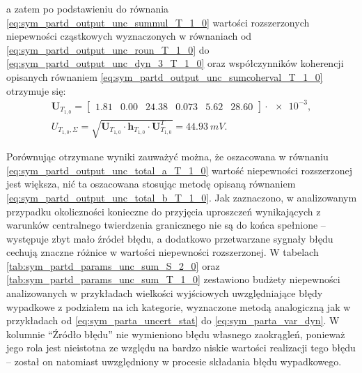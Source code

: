 a zatem po podstawieniu do równania \eqref{eq:sym_partd_output_unc_summul_T_1_0} wartości rozszerzonych niepewności cząstkowych wyznaczonych w równaniach od \eqref{eq:sym_partd_output_unc_roun_T_1_0} do \eqref{eq:sym_partd_output_unc_dyn_3_T_1_0} oraz współczynników koherencji opisanych równaniem \eqref{eq:sym_partd_output_unc_sumcoherval_T_1_0} otrzymuje się:
\begin{gather}
\mathbf{U}_{T_{1,0}} =
\begin{bmatrix}
\num{1.81} & \num{0.00} & \num{24.38} & \num{0.073} & \num{5.62} & \num{28.60}
\end{bmatrix} \cdot \num{e-3}
\label{eq:sym_partd_output_unc_sumuvectval_T_1_0}, \\
U_{T_{1,0},\Sigma} = \sqrt{\mathbf{U}_{T_{1,0}} \cdot \mathbf{h}_{T_{1,0}} \cdot \mathbf{U}_{T_{1,0}}^{T}} = \qty{44.93}{mV} \label{eq:sym_partd_output_unc_total_b_T_1_0}.
\end{gather}

Porównując otrzymane wyniki zauważyć można, że oszacowana w równaniu \eqref{eq:sym_partd_output_unc_total_a_T_1_0} wartość niepewności rozszerzonej jest większa, nić ta oszacowana stosując metodę opisaną równaniem \eqref{eq:sym_partd_output_unc_total_b_T_1_0}. Jak zaznaczono, w analizowanym przypadku okoliczności konieczne do przyjęcia uproszczeń wynikających z warunków centralnego twierdzenia granicznego nie są do końca spełnione -- występuje zbyt mało źródeł błędu, a dodatkowo przetwarzane sygnały błędu cechują znaczne różnice w wartości niepewności rozszerzonej. W tabelach \ref{tab:sym_partd_params_unc_sum_S_2_0} oraz \ref{tab:sym_partd_params_unc_sum_T_1_0} zestawiono budżety niepewności analizowanych w przykładach wielkości wyjściowych uwzględniające błędy wypadkowe z podziałem na ich kategorie, wyznaczone metodą analogiczną jak w przykładach od \eqref{eq:sym_parta_uncert_stat} do \eqref{eq:sym_parta_var_dyn}. W kolumnie \enquote{Źródło błędu} nie wymieniono błędu własnego zaokrągleń, ponieważ jego rola jest nieistotna ze względu na bardzo niskie wartości realizacji tego błędu -- został on natomiast uwzględniony w procesie składania błędu wypadkowego.

